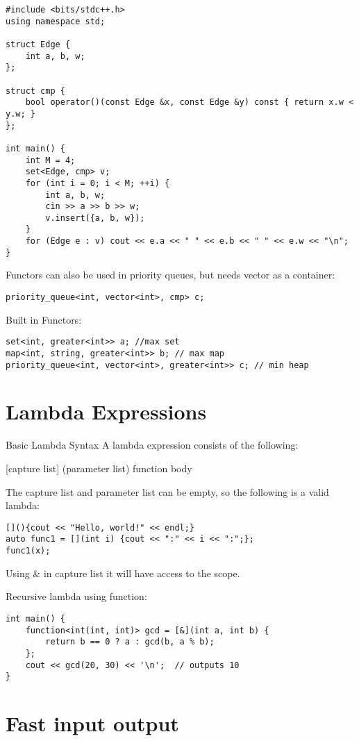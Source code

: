 \begin{lstlisting}
#include <bits/stdc++.h>
using namespace std;

struct Edge {
	int a, b, w;
};

struct cmp {
	bool operator()(const Edge &x, const Edge &y) const { return x.w < y.w; }
};

int main() {
	int M = 4;
	set<Edge, cmp> v;
	for (int i = 0; i < M; ++i) {
		int a, b, w;
		cin >> a >> b >> w;
		v.insert({a, b, w});
	}
	for (Edge e : v) cout << e.a << " " << e.b << " " << e.w << "\n";
}
\end{lstlisting}

Functors can also be used in priority queues, but needs vector as a container:

\begin{lstlisting}
priority_queue<int, vector<int>, cmp> c; 
\end{lstlisting}
Built in Functors:
\begin{lstlisting}
set<int, greater<int>> a; //max set
map<int, string, greater<int>> b; // max map
priority_queue<int, vector<int>, greater<int>> c; // min heap
\end{lstlisting}
\section{Lambda Expressions}
Basic Lambda Syntax
    A lambda expression consists of the following:
\begin{center}
    [capture list] (parameter list) {function body}
\end{center}
The capture list and parameter list can be empty, so the following is a valid lambda:
\begin{lstlisting}
[](){cout << "Hello, world!" << endl;}
auto func1 = [](int i) {cout << ":" << i << ":";};
func1(x);
\end{lstlisting}
Using \& in capture list it will have access to the scope.

Recursive lambda using function:
\begin{lstlisting}
int main() {
	function<int(int, int)> gcd = [&](int a, int b) {
		return b == 0 ? a : gcd(b, a % b);
	};
	cout << gcd(20, 30) << '\n';  // outputs 10
}
\end{lstlisting}
    
\section{Fast input output}
        

